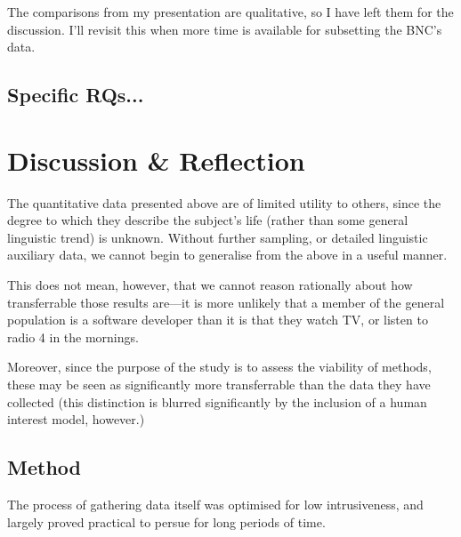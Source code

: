 The comparisons from my presentation are qualitative, so I have left them for the discussion.  I'll revisit this when more time is available for subsetting the BNC's data.








\subsection{Specific RQs...}










\section{Discussion \& Reflection}
The quantitative data presented above are of limited utility to others, since the degree to which they describe the subject's life (rather than some general linguistic trend) is unknown.  Without further sampling, or detailed linguistic auxiliary data, we cannot begin to generalise from the above in a useful manner.

This does not mean, however, that we cannot reason rationally about how transferrable those results are---it is more unlikely that a member of the general population is a software developer than it is that they watch TV, or listen to radio 4 in the mornings.

Moreover, since the purpose of the study is to assess the viability of methods, these may be seen as significantly more transferrable than the data they have collected (this distinction is blurred significantly by the inclusion of a human interest model, however.)






\subsection{Method}
The process of gathering data itself was optimised for low intrusiveness, and largely proved practical to persue for long periods of time.

